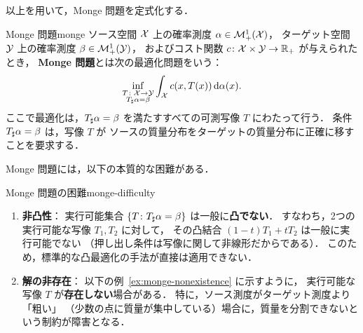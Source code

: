 以上を用いて，Monge 問題を定式化する．

\begin{setting}{Monge 問題}{monge}
  ソース空間 $\mathcal{X}$ 上の確率測度 $\alpha \in \mathcal{M}_+^1(\mathcal{X})$，
  ターゲット空間 $\mathcal{Y}$ 上の確率測度 $\beta \in \mathcal{M}_+^1(\mathcal{Y})$，
  およびコスト関数 $c \colon \mathcal{X} \times \mathcal{Y} \to \mathbb{R}_+$ が与えられたとき，
  \textbf{Monge 問題}とは次の最適化問題をいう：
  \[
    \inf_{\substack{T \colon \mathcal{X} \to \mathcal{Y} \\ T_\sharp \alpha = \beta}}
    \int_{\mathcal{X}} c(x, T(x)) \, \mathrm{d}\alpha(x).
  \]
  ここで最適化は，$T_\sharp \alpha = \beta$ を満たすすべての可測写像 $T$ にわたって行う．
  条件 $T_\sharp \alpha = \beta$ は，写像 $T$ が
  ソースの質量分布をターゲットの質量分布に正確に移すことを要求する．
\end{setting}

Monge 問題には，以下の本質的な困難がある．

\begin{remark}{Monge 問題の困難}{monge-difficulty}
  \begin{enumerate}
    \item \textbf{非凸性}：
      実行可能集合 $\{T \colon T_\sharp \alpha = \beta\}$ は一般に\textbf{凸でない}．
      すなわち，2つの実行可能な写像 $T_1, T_2$ に対して，
      その凸結合 $(1-t)T_1 + tT_2$ は一般に実行可能でない
      （押し出し条件は写像に関して非線形だからである）．
      このため，標準的な凸最適化の手法が直接は適用できない．

    \item \textbf{解の非存在}：
      以下の例~\ref{ex:monge-nonexistence} に示すように，
      実行可能な写像 $T$ が\textbf{存在しない}場合がある．
      特に，ソース測度がターゲット測度より「粗い」
      （少数の点に質量が集中している）場合に，質量を分割できないという制約が障害となる．
  \end{enumerate}
\end{remark}

